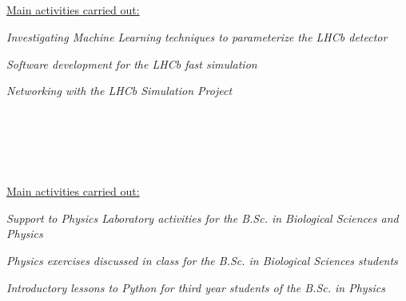 \begin{cvcontent}
  \\ [5mm]
  \\ [0.5mm]
  \\ [1.5mm]
  \\ [1.5mm]
  {\normalsize \color{maincolor} \ul{Main activities carried out:}\\ [1.5mm]
  \begin{itemize*}[label=\textcolor{iconcolor}{\textbullet}]
    \item \emph{Investigating Machine Learning techniques to 
      parameterize the LHCb detector}\\ [0.5mm]
    \item \emph{Software development for the LHCb fast simulation}\\ [0.5mm]
    \item \emph{Networking with the LHCb Simulation Project}
  \end{itemize*}}
  \\ [5mm]
  \\ [0.5mm]
  \\ [1.5mm]
  \\ [1.5mm]
  {\normalsize \color{maincolor} \ul{Main activities carried out:}\\ [1.5mm]
  \begin{itemize*}[label=\textcolor{iconcolor}{\textbullet}]
    \item \emph{Support to Physics Laboratory activities for 
      the B.Sc. in Biological Sciences and Physics}\\ [0.5mm]
    \item \emph{Physics exercises discussed in class for the 
      B.Sc. in Biological Sciences students}\\ [0.5mm]
    \item \emph{Introductory lessons to Python for third year 
      students of the B.Sc. in Physics}
  \end{itemize*}}
  \\ [5mm]
  \\ [0.5mm]

\end{cvcontent}
